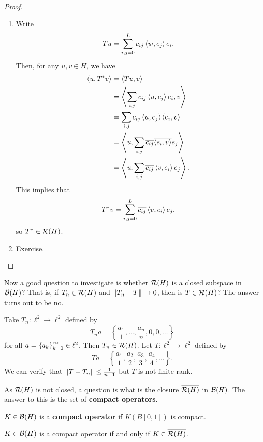 \documentclass[a4paper]{article}
\begin{document}
\begin{proof}
\begin{enumerate}
  \item Write 
  \[
  T u = \sum_{i, j = 0}^L c_{ij} \left\langle w, e_j \right\rangle e_i.
  \]
  Then, for any $u, v \in H$, we have 
  \[
  \begin{aligned}
    \left\langle u, T^* v \right\rangle &= \left\langle T u, v \right\rangle  \\
    &= \left\langle \sum_{i, j} c_{ij} \left\langle u, e_j \right\rangle e_i, v \right\rangle \\
    &= \sum_{i, j} c_{ij} \left\langle u, e_j \right\rangle \left\langle e_i, v \right\rangle \\ 
    &= \left\langle u, \sum_{i, j} \overline{c_{ij}} \overline{\left\langle e_i, v \right\rangle} e_j \right\rangle \\
    &= \left\langle u, \sum_{i, j} \overline{c_{ij}} \left\langle v, e_i \right\rangle e_j \right\rangle.
  \end{aligned}
  \]
  This implies that 
  \[
  T^* v = \sum_{i, j = 0}^L \overline{c_{ij}} \left\langle v, e_i \right\rangle e_j,
  \]
  so $T^* \in \mathcal{R}(H)$.
  \item Exercise.
\end{enumerate}
\end{proof}

Now a good question to investigate is whether 
$\mathcal{R}(H)$ is a closed subspace in $\mathcal{B}(H)$?
That is, if $T_n \in \mathcal{R}(H)$ and $\left\lVert T_n - T\right\rVert \to 0$, 
then is $T \in \mathcal{R}(H)$? The answer turns out to be no. 

\begin{eg}
Take $T_n : \ell^2 \to \ell^2$ defined by 
\[
T_n a = \left\{ \frac{a_1}{1}, \dots, \frac{a_n}{n}, 0, 
0, \dots \right\}
\]
for all $a = \left\{ a_k \right\}_{k=0}^\infty \in \ell^2$. Then $T_n 
\in \mathcal{R}(H)$. Let $T : \ell^2 \to \ell^2$ defined 
by 
\[
T a = \left\{ \frac{a_1}{1}, \frac{a_2}{2}, 
\frac{a_3}{3}, \frac{a_4}{4}, \dots \right\}.
\]
We can verify that $\left\lVert T - T_n\right\rVert \leq \frac{1}{n + 1}$
but $T$ is not finite rank.
\end{eg}

As $\mathcal{R}(H)$ is not closed, a question is what is 
the closure $\overline{\mathcal{R}(H)}$ in $\mathcal{B}(H)$. The answer to 
this is the set of \textbf{compact operators}. 

\begin{defi}
  $K \in \mathcal{B}(H)$ is a \textbf{compact operator}
  if $\bar{K(B[0, 1])}$ is compact.
\end{defi}

\begin{thm}
$K \in \mathcal{B}(H)$ is a compact operator if and only if 
$K \in \overline{\mathcal{R}(H)}$.
\end{thm}
\end{document}
